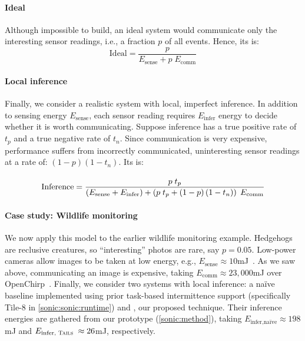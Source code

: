\tabSONICMotivateModel

\paragraph{Ideal}
%
Although impossible to build, an ideal system would communicate only
the interesting sensor readings, i.e., a fraction $p$ of all events.
%
Hence, its \metric is:
\begin{equation}
  \text{Ideal}
  = \frac{p}{E_\text{sense} + p \; E_\text{comm}}
\end{equation}

\paragraph{Local inference}
%
Finally, we consider a realistic system with local, imperfect inference.
%
In addition to sensing energy $E_\text{sense}$,
each sensor reading requires $E_\text{infer}$ energy to decide whether it is worth communicating.
%
Suppose inference has a true positive rate
of $t_p$ and a true negative rate
of $t_n$.
%
Since communication is very expensive, performance
suffers from incorrectly communicated,
uninteresting sensor readings at a rate of: $\left(1-p\right)\left(1-t_n\right) $.
%
Its \metric is:
\vspace{-1em}
\begin{align}
  \label{eq:impj}
  & \\[-0.85em]
  \text{Inference}
  &= \frac{p \; t_p}{\left(E_\text{sense} + E_\text{infer}\right) + \left(p \; t_p + \left(1-p\right)\left(1-t_n\right)\right) \; E_\text{comm}} \notag
\end{align}

\paragraph{Case study: Wildlife monitoring}
%
We now apply this model to the earlier wildlife monitoring example.
%
Hedgehogs are reclusive creatures, so ``interesting'' photos are rare,
say $p = 0.05$.
%
Low-power cameras allow images to be taken at low energy, e.g.,
$E_\text{sense} \approx 10$mJ~\cite{wispcam}.
%
As we saw above, communicating an image is expensive, taking
$E_\text{comm} \approx 23,\!000$mJ over OpenChirp~\cite{dongare2017openchirp}.
%
Finally, we consider two systems with local inference:
a na\"ive baseline implemented using prior task-based intermittence support (specifically Tile-8 in \autoref{sonic:sonic:runtime})
and \sonictails, our proposed technique.
Their inference energies are gathered from our prototype (\autoref{sonic:method}),
taking $E_\text{infer,na\"ive} \approx 198$mJ and $E_\text{infer,\tails} \approx 26$mJ, respectively.

